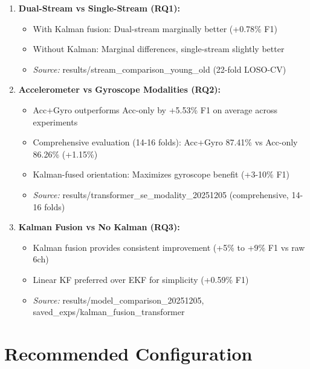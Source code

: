 \documentclass{article}
\begin{document}
\begin{enumerate}
    \item \textbf{Dual-Stream vs Single-Stream (RQ1):}
    \begin{itemize}
        \item With Kalman fusion: Dual-stream marginally better (+0.78\% F1)
        \item Without Kalman: Marginal differences, single-stream slightly better
        \item \textit{Source:} results/stream\_comparison\_young\_old (22-fold LOSO-CV)
    \end{itemize}

    \item \textbf{Accelerometer vs Gyroscope Modalities (RQ2):}
    \begin{itemize}
        \item Acc+Gyro outperforms Acc-only by +5.53\% F1 on average across experiments
        \item Comprehensive evaluation (14-16 folds): Acc+Gyro 87.41\% vs Acc-only 86.26\% (+1.15\%)
        \item Kalman-fused orientation: Maximizes gyroscope benefit (+3-10\% F1)
        \item \textit{Source:} results/transformer\_se\_modality\_20251205 (comprehensive, 14-16 folds)
    \end{itemize}

    \item \textbf{Kalman Fusion vs No Kalman (RQ3):}
    \begin{itemize}
        \item Kalman fusion provides consistent improvement (+5\% to +9\% F1 vs raw 6ch)
        \item Linear KF preferred over EKF for simplicity (+0.59\% F1)
        \item \textit{Source:} results/model\_comparison\_20251205, saved\_exps/kalman\_fusion\_transformer
    \end{itemize}
\end{enumerate}

\appendix

\section{Recommended Configuration}
\end{document}
